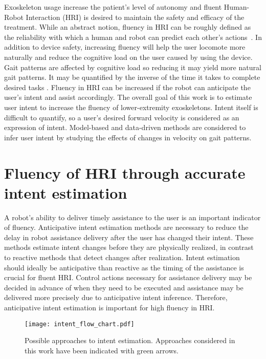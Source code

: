 Exoskeleton usage increase the patient's level of autonomy and fluent Human-Robot Interaction (HRI) is desired to maintain the safety and efficacy of the treatment. While an abstract notion, fluency in HRI can be roughly defined as the reliability with which a human and robot can predict each other's actions~\cite{hoffman2007cost}. In addition to device safety, increasing fluency will help the user locomote more naturally and reduce the cognitive load on the user caused by using the device. Gait patterns are affected by cognitive load \cite{bogen2018walk} so reducing it may yield more natural gait patterns. It may be quantified by the inverse of the time it takes to complete desired tasks \cite{hoffman2019evaluating}. Fluency in HRI can be increased if the robot can anticipate the user's intent and assist accordingly. The overall goal of this work is to estimate user intent to increase the fluency of lower-extremity exoskeletons. Intent itself is difficult to quantify, so a user's desired forward velocity is considered as an expression of intent. Model-based and data-driven methods are considered to infer user intent by studying the effects of changes in velocity on gait patterns.

\section{Fluency of HRI through accurate intent estimation}

A robot's ability to deliver timely assistance to the user is an important indicator of fluency. Anticipative intent estimation methods are necessary to reduce the delay in robot assistance delivery after the user has changed their intent. These methods estimate intent changes before they are physically realized, in contrast to reactive methods that detect changes after realization. Intent estimation should ideally be anticipative than reactive as the timing of the assistance is crucial for fluent HRI. Control actions necessary for assistance delivery may be decided in advance of when they need to be executed and assistance may be delivered more precisely due to anticipative intent inference. Therefore, anticipative intent estimation is important for high fluency in HRI.

\begin{figure}
	\centering
	\texttt{[image: intent\_flow\_chart.pdf]}
	\caption{Possible approaches to intent estimation. Approaches considered in this work have been indicated with green arrows.}\label{fig:flow}
\end{figure}

